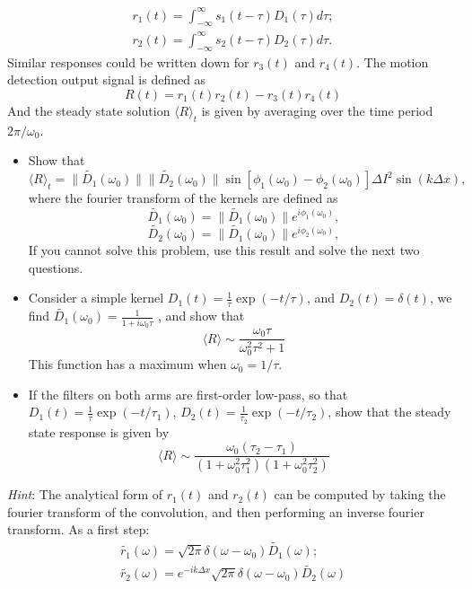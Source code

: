 \documentclass{article}
\begin{document}
\begin{equation}
\begin{aligned}
r_1(t)=\int _{-\infty} ^{\infty} s_1(t-\tau) D_1(\tau) d\tau; \\
r_2(t)=\int _{-\infty} ^{\infty} s_2(t-\tau) D_2(\tau) d\tau.
\end{aligned}
\end{equation}
Similar responses could be written down for $r_3(t)$ and $r_4(t)$.  The motion detection output signal is defined as 
\begin{equation}
R(t) =r_1(t)r_2(t) - r_3(t)r_4(t)
\end{equation}
And the steady state solution $\langle R \rangle_{t}$ is given by averaging over the time period $2\pi /\omega_0$. 

\begin{itemize}
\item{Show that 
\begin{equation}
\langle R \rangle_{t} = \|\tilde{D_1}(\omega_0)\| \|\tilde{D_2}(\omega_0)\| \sin[\phi_1(\omega_0)-\phi_2(\omega_0)] \Delta I^2 \sin (k\Delta x),
\end{equation}
where the fourier transform of the kernels are defined as
\[ \tilde{D_1}(\omega_0) = \|\tilde{D_1}(\omega_0)\|e^{i\phi_1(\omega_0)}, \] 
\[ \tilde{D_2}(\omega_0) = \|\tilde{D_1}(\omega_0)\|e^{i\phi_2(\omega_0)}, \]
If you cannot solve this problem, use this result and solve the next two questions. }

 \item {Consider a simple kernel $D_1(t) = \frac{1}{\tau} \exp(-t/\tau) $, and $D_2(t) =\delta(t)$,  we find $\tilde{D_1}(\omega_0) =\frac{1}{1+i\omega_0 \tau}$ , and show that 
\begin{equation}
\langle R \rangle \sim \frac{\omega_0 \tau}{\omega_0^2 \tau^2+1}
\end{equation}
This function has a maximum when $\omega_0 = 1/\tau$. }


 \item {If the filters on both arms are first-order low-pass, so that $D_1(t) = \frac{1}{\tau} \exp(-t/\tau_1) $, $D_2(t) = \frac{1}{\tau_2} \exp(-t/\tau_2) $, show that the steady state response is given by
\begin{equation}
\langle R \rangle \sim \frac{\omega_0( \tau_2 - \tau_1)}{(1+\omega_0^2 \tau_1^2)(1+\omega_0^2\tau_2^2)}
\end{equation} }
\end{itemize}
\textit{Hint}: The analytical form of $r_1(t)$ and $r_2(t)$ can be computed by taking the fourier transform of the convolution, and then performing an inverse fourier transform. As a first step:
\begin{equation}
\begin{aligned}
\tilde{r_1}(\omega) =\sqrt{2\pi}\delta(\omega-\omega_0)\tilde{D_1}(\omega);\\
\tilde{r_2}(\omega) =e^{-i k\Delta x}\sqrt{2\pi}\delta(\omega-\omega_0)\tilde{D_2}(\omega)
\end{aligned}
\end{equation}
\end{document}
